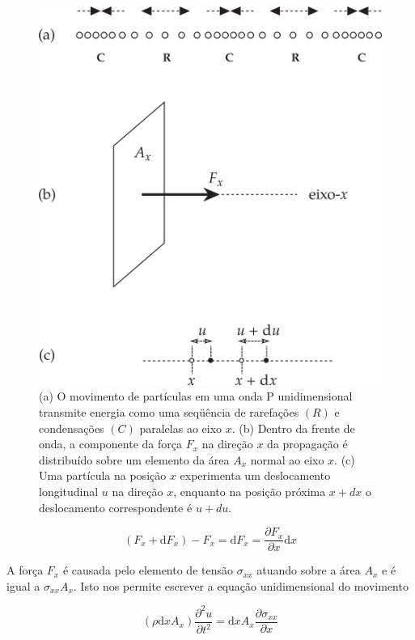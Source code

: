 \documentclass[]{book}
\theoremstyle{definition}
\theoremstyle{definition}
\theoremstyle{definition}
\theoremstyle{remark}
\begin{document}
\begin{figure}

{\centering \includegraphics[width=0.7\linewidth]{fig/Fig_03.11} 

}

\caption{(a) O movimento de partículas em uma onda P unidimensional transmite energia como uma seqüência de rarefações $(R)$ e condensações $(C)$ paralelas ao eixo $x$. (b) Dentro da frente de onda, a componente da força $F_x$ na direção $x$ da propagação é distribuído sobre um elemento da área $A_x$ normal ao eixo $x$. (c) Uma partícula na posição $x$ experimenta um deslocamento longitudinal $u$ na direção $x$, enquanto na posição próxima $x+dx$ o deslocamento correspondente é $u+ du$.}\label{fig:particula}
\end{figure}

\begin{equation}
\left(F_{x}+\mathrm{d} F_{x}\right)-F_{x}=\mathrm{d} F_{x}=\frac{\partial F_{x}}{\partial x} \mathrm{d} x \label{eq:0315}
\end{equation}

A força \(F_x\) é causada pelo elemento de tensão \(\sigma_{xx}\) atuando sobre a área \(A_x\) e é igual a \(\sigma_{xx}A_x\). Isto nos permite escrever a equação unidimensional do movimento

\begin{equation}
\left(\rho \mathrm{d} x A_{x}\right) \frac{\partial^{2} u}{\partial t^{2}}=\mathrm{d} x A_{x} \frac{\partial \sigma_{x x}}{\partial x} \label{eq:0316}
\end{equation}
\end{document}
